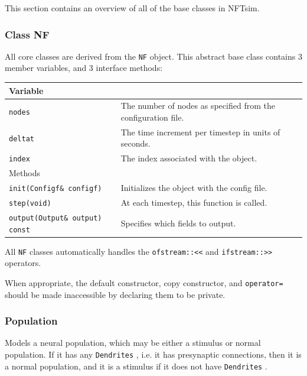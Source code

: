\documentclass[12pt,a4paper]{article}
\newcommand{\type}[1]{{\small\small\tt #1} }
\begin{document}
This section contains an overview of all of the base classes in NFTsim.

\subsubsection{Class NF}
\label{sec:nf}

All core classes are derived from the \type{NF} object. This abstract base class contains 3 member variables, and 3 interface methods:

\begin{tabular}{l l}
    \hline
Variable\\[6pt]
\hline
\type{nodes}&The number of nodes as specified from the configuration file.\\
\type{deltat}&The time increment per timestep in units of seconds.\\
\type{index}&The index associated with the object.\\[6pt]
\hline
Methods\\[6pt]
\hline
\type{init(Configf\& configf)}&Initializes the object with the config file.\\
\type{step(void)}&At each timestep, this function is called.\\
\type{output(Output\& output) const}&Specifies which fields to output.\\
\end{tabular}

All \type{NF} classes automatically handles the \type{ofstream::<<} and \type{ifstream::>>} operators.

When appropriate, the default constructor, copy constructor, and \type{operator=} should be made inaccessible by declaring them to be private.

\subsubsection{Population}
\label{sec:pop}

Models a neural population, which may be either a stimulus or normal population. If it has any \type{Dendrites}, i.e. it has presynaptic connections, then it is a normal population, and it is a stimulus if it does not have \type{Dendrites}.
\end{document}
